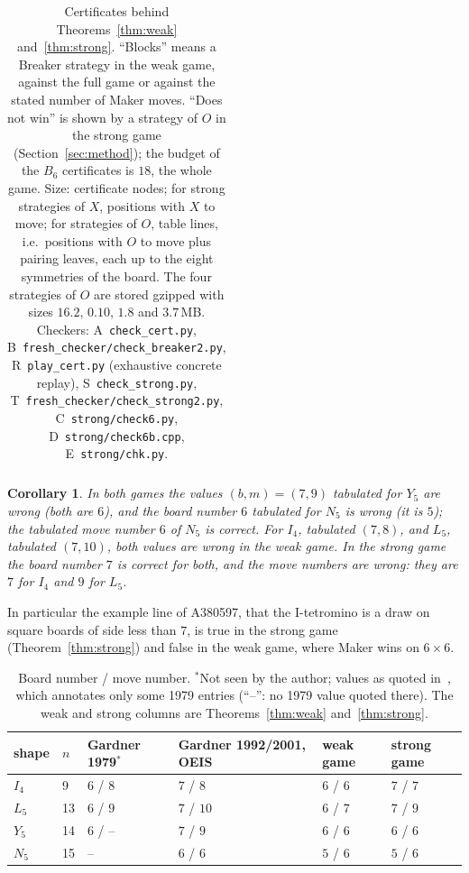 \documentclass[11pt]{article}
\newtheorem{corollary}[theorem]{Corollary}
\theoremstyle{definition}
\theoremstyle{remark}
\newcommand{\file}[1]{\texttt{#1}}
\begin{document}
\begin{table}[ht]
\begin{tabular}{@{}lllrll@{}}
\bottomrule
\end{tabular}
\caption{Certificates behind Theorems~\ref{thm:weak} and~\ref{thm:strong}. ``Blocks'' means a
Breaker strategy in the weak game, against the full game or against the stated number of Maker
moves. ``Does not win'' is shown by a strategy of $O$ in the strong game (Section~\ref{sec:method});
the budget of the $B_6$ certificates is $18$, the whole game. Size: certificate nodes; for strong
strategies of $X$, positions with $X$ to move; for strategies of $O$, table lines, i.e.\ positions
with $O$ to move plus pairing leaves, each up to the eight symmetries of the board. The four
strategies of $O$ are stored gzipped with sizes $16.2$, $0.10$, $1.8$ and $3.7$\,MB. Checkers:
A~\file{check\_cert.py}, B~\file{fresh\_checker/check\_breaker2.py}, R~\file{play\_cert.py}
(exhaustive concrete replay), S~\file{check\_strong.py}, T~\file{fresh\_checker/check\_strong2.py},
C~\file{strong/check6.py}, D~\file{strong/check6b.cpp}, E~\file{strong/chk.py}.}
\label{tab:evidence}
\end{table}

\begin{corollary}\label{cor:oeis}
In both games the values $(b,m)=(7,9)$ tabulated for $Y_5$ are wrong (both are $6$), and the board
number $6$ tabulated for $N_5$ is wrong (it is $5$); the tabulated move number $6$ of $N_5$ is
correct. For $I_4$, tabulated $(7,8)$, and $L_5$, tabulated $(7,10)$, both values are wrong in the
weak game. In the strong game the board number $7$ is correct for both, and the move numbers are
wrong: they are $7$ for $I_4$ and $9$ for $L_5$.
\end{corollary}

In particular the example line of A380597, that the I-tetromino is a draw on square boards of side
less than $7$, is true in the strong game (Theorem~\ref{thm:strong}) and false in the weak game,
where Maker wins on $6\times 6$.

\begin{table}[ht]
\centering\small
\begin{tabular}{@{}llllll@{}}
\toprule
shape & $n$ & Gardner 1979$^{\ast}$ & Gardner 1992/2001, OEIS & weak game & strong game\\
\midrule
$I_4$ & 9  & $6$ / $8$ & $7$ / $8$  & $6$ / $6$ & $7$ / $7$\\
$L_5$ & 13 & $6$ / $9$ & $7$ / $10$ & $6$ / $7$ & $7$ / $9$\\
$Y_5$ & 14 & $6$ / --  & $7$ / $9$  & $6$ / $6$ & $6$ / $6$\\
$N_5$ & 15 & --        & $6$ / $6$  & $5$ / $6$ & $5$ / $6$\\
\bottomrule
\end{tabular}
\caption{Board number / move number. $^{\ast}$Not seen by the author; values as quoted
in~\cite{Wiki}, which annotates only some 1979 entries (``--'': no 1979 value quoted there). The weak and strong columns are Theorems~\ref{thm:weak} and~\ref{thm:strong}.}
\label{tab:compare}
\end{table}
\end{document}
